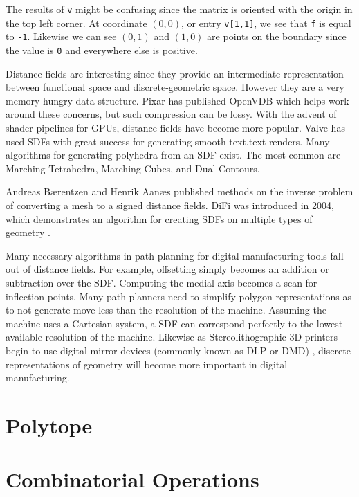 The results of \texttt{v} might be confusing since the matrix is oriented with
the origin in the top left corner. At coordinate $(0,0)$, or entry \texttt{v[1,1]},
we see that \texttt{f} is
equal to \texttt{-1}. Likewise we can see $(0,1)$ and $(1,0)$ are points on
the boundary since the value is \texttt{0} and everywhere else is positive.

Distance fields are interesting since they provide an intermediate representation
between functional space and discrete-geometric space. However they are
a very memory hungry data structure. Pixar has published OpenVDB which helps
work around these concerns, but such compression can be lossy.\cite{OpenVDB}
With the advent of shader pipelines for GPUs, distance fields have become
more popular. Valve has used SDFs with great success for generating smooth
text.text renders. \cite{Green_2007}
Many algorithms for generating polyhedra from an SDF
exist. The most common are Marching Tetrahedra, Marching Cubes,
and Dual Contours.\cite{Muller_Wehle_1997}\cite{Newman_Yi_2006}\cite{Cook_Hourvitz}


Andreas Bærentzen and Henrik Aanæs published methods on the inverse
problem of converting a mesh to a signed distance fields.\cite{Baerentzen_Aanaes}
DiFi was introduced in 2004, which demonstrates an algorithm for creating
SDFs on multiple types of geometry \cite{Sud_Otaduy_Manocha_2004}.

Many necessary algorithms in path planning for digital manufacturing tools
fall out of distance fields. For example, offsetting simply becomes
an addition or subtraction over the SDF. Computing the medial axis becomes
a scan for inflection points. Many path planners need to simplify polygon
representations as to not generate move less than the resolution of the machine.
Assuming the machine uses a Cartesian system, a SDF can correspond perfectly
to the lowest available resolution of the machine.
Likewise as Stereolithographic 3D printers
begin to use digital mirror devices (commonly known as DLP or DMD)
, discrete representations of geometry will become more important in
digital manufacturing.

\cite{Pasko_Adzhiev_Comninos_2008}


\section{Polytope}


\section{Combinatorial Operations}




